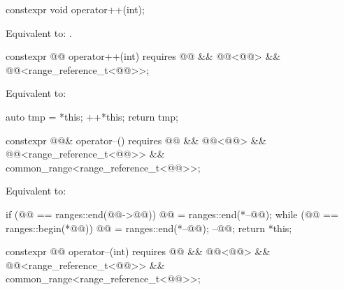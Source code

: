 %
\begin{itemdecl}
constexpr void operator++(int);
\end{itemdecl}

\begin{itemdescr}
\pnum
\effects
Equivalent to: .
\end{itemdescr}

%
\begin{itemdecl}
constexpr @@ operator++(int)
  requires @@ && @@<@@> &&
           @@<range_reference_t<@@>>;
\end{itemdecl}

\begin{itemdescr}
\pnum
\effects
Equivalent to:
\begin{codeblock}
auto tmp = *this;
++*this;
return tmp;
\end{codeblock}
\end{itemdescr}

%
\begin{itemdecl}
constexpr @@& operator--()
  requires @@ && @@<@@> &&
           @@<range_reference_t<@@>> &&
           common_range<range_reference_t<@@>>;
\end{itemdecl}

\begin{itemdescr}
\pnum
\effects
Equivalent to:
\begin{codeblock}
if (@@ == ranges::end(@@->@@))
  @@ = ranges::end(*--@@);
while (@@ == ranges::begin(*@@))
  @@ = ranges::end(*--@@);
--@@;
return *this;
\end{codeblock}
\end{itemdescr}

%
\begin{itemdecl}
constexpr @@ operator--(int)
  requires @@ && @@<@@> &&
           @@<range_reference_t<@@>> &&
           common_range<range_reference_t<@@>>;
\end{itemdecl}

